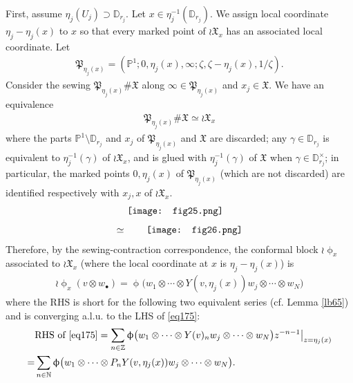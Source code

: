 \documentclass[12pt,a4paper,notitlepage]{article}
\theoremstyle{definition}
\theoremstyle{plain}
\newcommand{\fk}{\mathfrak}
\newcommand{\blt}{\bullet}
\newcommand{\Nbb}{\mathbb N}
\newcommand{\Zbb}{\mathbb Z}
\newcommand{\Pbb}{\mathbb P}
\newcommand{\Dbb}{\mathbb D}
\numberwithin{equation}{section}
\begin{document}
First, assume  $\eta_j(U_j)\supset\Dbb_{r_j}$.  Let $x\in\eta_j^{-1}(\Dbb_{r_j})$. We assign local coordinate $\eta_j-\eta_j(x)$ to $x$ so that every marked point of $\wr\fk X_x$ has an associated local coordinate. Let 
\begin{align}
	\fk P_{\eta_j(x)}=(\Pbb^1;0,\eta_j(x),\infty;\zeta,\zeta-\eta_j(x),1/\zeta).	
\end{align}
Consider the sewing $\fk P_{\eta_j(x)}\#\fk X$ along $\infty\in\fk P_{\eta_j(x)}$ and $x_j\in\fk X$.  We have an equivalence
\begin{align}
	\fk P_{\eta_j(x)}\#\fk X \simeq \wr\fk X_x	
\end{align}
where the parts $\Pbb^1\setminus\Dbb_{r_j}$ and $x_j$ of $\fk P_{\eta_j(x)}$ and $\fk X$ are discarded; any $\gamma\in\Dbb_{r_j}$ is equivalent to $\eta_j^{-1}(\gamma)$ of $\wr\fk X_x$, and is glued with $\eta_j^{-1}(\gamma)$ of $\fk X$ when $\gamma\in\Dbb_{r_j}^\times$; in particular, the marked points $0,\eta_j(x)$ of $\fk P_{\eta_j(x)}$ (which are not discarded) are identified respectively with $x_j,x$ of $\wr\fk X_x$. 
\begin{align}
	\begin{aligned}
		&\vcenter{\hbox{{
					\texttt{[image: fig25.png]}}}}\\[1ex]
		\simeq&\qquad\vcenter{\hbox{{
					\texttt{[image: fig26.png]}}}}
	\end{aligned}	
\end{align}
Therefore, by the sewing-contraction correspondence, the conformal block $\wr\upphi_x$ associated to $\wr\fk X_x$ (where the local coordinate at $x$ is $\eta_j-\eta_j(x)$) is
\begin{align}
	\wr\upphi_x(v\otimes w_\blt)=\upphi\big(w_1\otimes\cdots \otimes Y(v,\eta_j(x))w_j\otimes\cdots \otimes w_N\big)	\label{eq175}
\end{align}
where the RHS is short for the following two equivalent series (cf. Lemma \ref{lb65}) and is converging a.l.u. to the LHS of \eqref{eq175}:
\begin{align}\label{eq191}
\begin{aligned}
&\text{RHS of }\eqref{eq175}=\sum_{n\in\Zbb}\upphi\big(w_1\otimes\cdots \otimes Y(v)_nw_j\otimes\cdots \otimes w_N\big)z^{-n-1}\big|_{z=\eta_j(x)}\\
=&\sum_{n\in\Nbb}\upphi\big(w_1\otimes\cdots \otimes P_nY(v,\eta_j(x))w_j\otimes\cdots \otimes w_N\big).
\end{aligned}	
\end{align}
\end{document}
